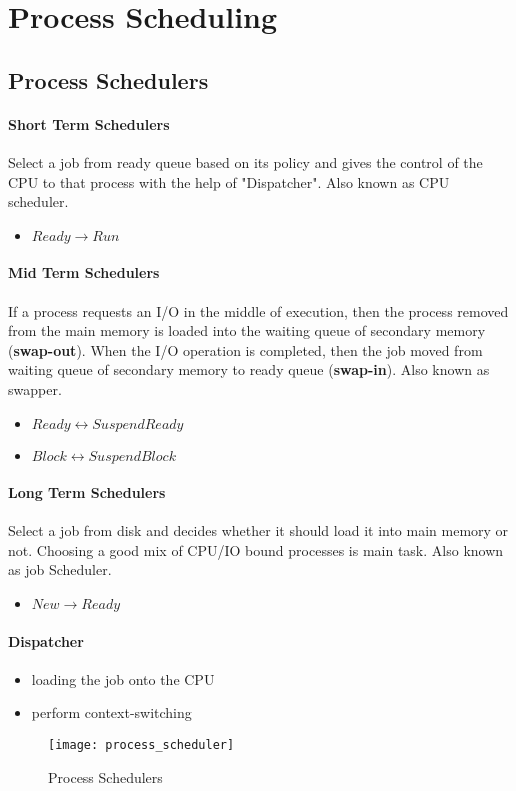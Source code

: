\section{Process Scheduling}
\subsection{Process Schedulers}
\paragraph{Short Term Schedulers} Select a job from ready queue based on its policy and gives the control of the CPU to that process with the help of "Dispatcher". Also known as CPU scheduler.
\begin{itemize}
	\item $Ready \rightarrow Run$
\end{itemize}
\paragraph{Mid Term Schedulers} If a process requests an I/O in the middle of execution, then the process removed from the main memory is loaded into the waiting queue of secondary memory (\textbf{swap-out}). When the I/O operation is completed, then the job moved from waiting queue of secondary memory to ready queue (\textbf{swap-in}). Also known as swapper.
\begin{itemize}
	\item $Ready \leftrightarrow Suspend Ready$
	\item $Block \leftrightarrow Suspend Block$
\end{itemize}
\paragraph{Long Term Schedulers} Select a job from disk and decides whether it should load it into main memory or not. Choosing a good mix of CPU/IO bound processes is main task. Also known as job Scheduler.
\begin{itemize}
	\item $New \rightarrow Ready$
\end{itemize}
\paragraph{Dispatcher}
\begin{itemize}
	\item loading the job onto the CPU
	\item perform context-switching
\end{itemize}
\begin{figure}[H]
	\centering
	\texttt{[image: process\_scheduler]}
	\caption{Process Schedulers}\label{fig_process_scheduler_diagram}
\end{figure}

